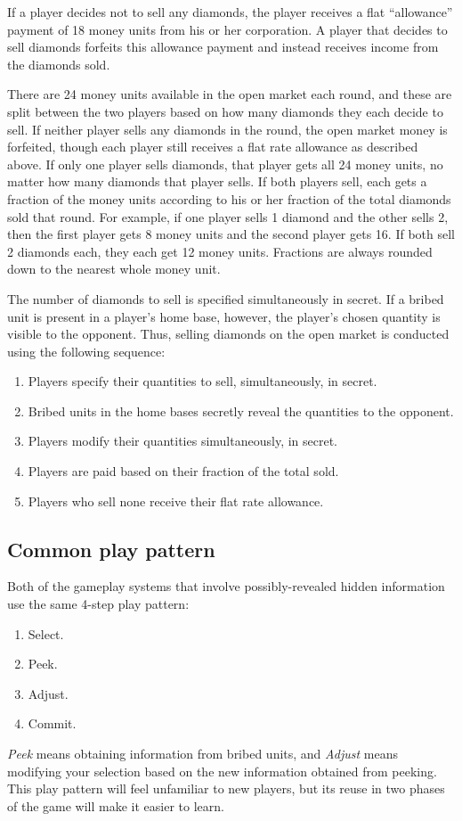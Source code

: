 \documentclass[12pt]{article}
\begin{document}
If a player decides not to sell any diamonds, the player receives a flat ``allowance'' payment of 18 money units from his or her corporation.  A player that decides to sell diamonds forfeits this allowance payment and instead receives income from the diamonds sold.

There are 24 money units available in the open market each round, and these are split between the two players based on how many diamonds they each decide to sell.  If neither player sells any diamonds in the round, the open market money is forfeited, though each player still receives a flat rate allowance as described above.  If only one player sells diamonds, that player gets all 24 money units, no matter how many diamonds that player sells.  If both players sell, each gets a fraction of the money units according to his or her fraction of the total diamonds sold that round.  For example, if one player sells 1 diamond and the other sells 2, then the first player gets 8 money units and the second player gets 16.  If both sell 2 diamonds each, they each get 12 money units.  Fractions are always rounded down to the nearest whole money unit.   

The number of diamonds to sell is specified simultaneously in secret.  If a bribed unit is present in a player's home base, however, the player's chosen quantity is visible to the opponent.  Thus, selling diamonds on the open market is conducted using the following sequence: 
\begin{enumerate}
\item Players specify their quantities to sell, simultaneously, in secret.
\item Bribed units in the home bases secretly reveal the quantities to the opponent.
\item Players modify their quantities simultaneously, in secret.
\item Players are paid based on their fraction of the total sold.
\item Players who sell none receive their flat rate allowance.
\end{enumerate}

\subsection{Common play pattern}
Both of the gameplay systems that involve possibly-revealed hidden information use the same 4-step play pattern:
\begin{enumerate}
\item Select.
\item Peek.
\item Adjust.
\item Commit.
\end{enumerate}
{\it Peek} means obtaining information from bribed units, and {\it Adjust} means modifying your selection based on the new information obtained from peeking.  This play pattern will feel unfamiliar to new players, but its reuse in two phases of the game will make it easier to learn.
\end{document}
